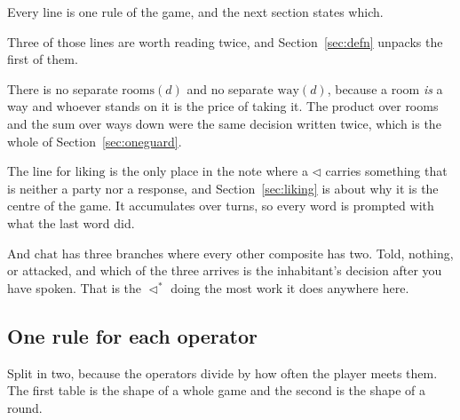 \documentclass[11pt,a4paper]{article}
\newcommand{\seqb}{\lhd^{\ast}}
\begin{document}
Every line is one rule of the game, and the next section states which.

Three of those lines are worth reading twice, and Section~\ref{sec:defn} unpacks the first of
them.

There is no separate $\text{rooms}(d)$ and no separate $\text{way}(d)$, because a room \emph{is} a
way and whoever stands on it is the price of taking it. The product over rooms and the sum over
ways down were the same decision written twice, which is the whole of
Section~\ref{sec:oneguard}.

The line for $\text{liking}$ is the only place in the note where a $\lhd$ carries something that is
neither a party nor a response, and Section~\ref{sec:liking} is about why it is the centre of the
game. It accumulates over turns, so every word is prompted with what the last word did.

And $\text{chat}$ has three branches where every other composite has two. Told, nothing, or
attacked, and which of the three arrives is the inhabitant's decision after you have spoken. That
is the $\seqb$ doing the most work it does anywhere here.

\subsection{One rule for each operator}

Split in two, because the operators divide by how often the player meets them. The first table is
the shape of a whole game and the second is the shape of a round.
\end{document}
